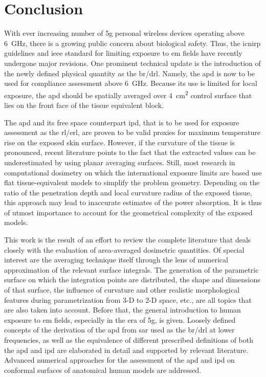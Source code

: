 \chapter{Conclusion}

With ever increasing number of \gls{5g} personal wireless devices operating above \SI{6}{\GHz}, there is a growing public concern about biological safety.
Thus, the \gls{icnirp} guidelines and \gls{ieee} standard for limiting exposure to \gls{em} fields have recently undergone major revisions.
One prominent technical update is the introduction of the newly defined physical quantity as the \gls{br}/\gls{drl}.
Namely, the \gls{apd} is now to be used for compliance assessment above \SI{6}{\GHz}.
Because its use is limited for local exposure, the \gls{apd} should be spatially averaged over \SI{4}{\cm\squared} control surface that lies on the front face of the tissue equivalent block.

The \gls{apd} and its free space counterpart \gls{ipd}, that is to be used for exposure assessment as the \gls{rl}/\gls{erl}, are proven to be valid proxies for maximum temperature rise on the exposed skin surface.
However, if the curvature of the tissue is pronounced, recent literature points to the fact that the extracted values can be underestimated by using planar averaging surfaces.
Still, most research in computational dosimetry on which the international exposure limits are based use flat tissue-equivalent models to simplify the problem geometry.
Depending on the ratio of the penetration depth and local curvature radius of the exposed tissue, this approach may lead to inaccurate estimates of the power absorption.
It is thus of utmost importance to account for the geometrical complexity of the exposed models.

This work is the result of an effort to review the complete literature that deals closely with the evaluation of area-averaged dosimetric quantities.
Of special interest are the averaging technique itself through the lens of numerical approximation of the relevant surface integrals.
The generation of the parametric surface on which the integration points are distributed, the shape and dimensions of that surface, the influence of curvature and other realistic morphological features during parametrization from 3-D to 2-D space, etc., are all topics that are also taken into account.
Before that, the general introduction to human exposure to \gls{em} fields, especially in the era of \gls{5g}, is given.
Loosely defined concepts of the derivation of the \gls{apd} from \gls{sar} used as the \gls{br}/\gls{drl} at lower frequencies, as well as the equivalence of different prescribed definitions of both the \gls{apd} and \gls{ipd} are elaborated in detail and supported by relevant literature.
Advanced numerical approaches for the assessment of the \gls{apd} and \gls{ipd} on conformal surfaces of anatomical human models are addressed.

